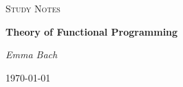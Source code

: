 \begin{titlepage}
	\centering
	{\Large \textsc{Study Notes}\par}
	\vspace{0.5cm}
	{\huge\bfseries Theory of Functional Programming\par}
    \vspace{1cm}
	{\Large\itshape Emma Bach\par}

	{\large \today\par}
\end{titlepage}
